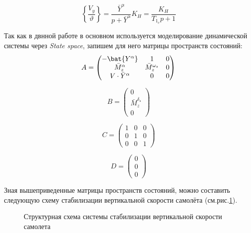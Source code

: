 \begin{equation}
    \label{eq:ПФ вертикальной скорости по углу тангажа}
   \left \{ \frac{V_y}{\vartheta} \right \}
    = \frac{\bar{Y}^{\alpha}}{p+\bar{Y}^{\alpha}}K_H =  \frac{K_H}{T_1_c p+1}
\end{equation}

Так как в двнной работе в основном используется моделирование динамической системы через \textit{State space}, запишем для него матрицы пространств состояний:
$$A = \begin{pmatrix}
-\bat{Y^{\alpha}} & 1 & 0\\ 
\bar{M}_z^\alpha & \bar{M}_z^{\omega_z} & 0\\ 
 V \cdot \bar{Y}^\alpha& 0 & 0 
\end{pmatrix}$$

$$B = \begin{pmatrix}
 0 \\ 
 \bar{M}_z^{\delta_{\text{э}}} \\ 
 0 
\end{pmatrix}$$

$$C= \begin{pmatrix}
1 & 0 & 0\\ 
0 & 1 & 0\\ 
 0& 0 &1 
\end{pmatrix}$$

$$D = \begin{pmatrix}
 0 \\ 
 0 \\ 
 0 
\end{pmatrix}$$

Зная вышеприведенные матрицы пространств состояний, можно составить следующую схему стабилизации вертикальной скорости самолёта (см.рис.\ref{fig:Схема}).


\begin{figure}[H]
    \caption{Структурная схема системы стабилизации вертикальной скорости самолета}
    \label{fig:Схема}
\end{figure}

